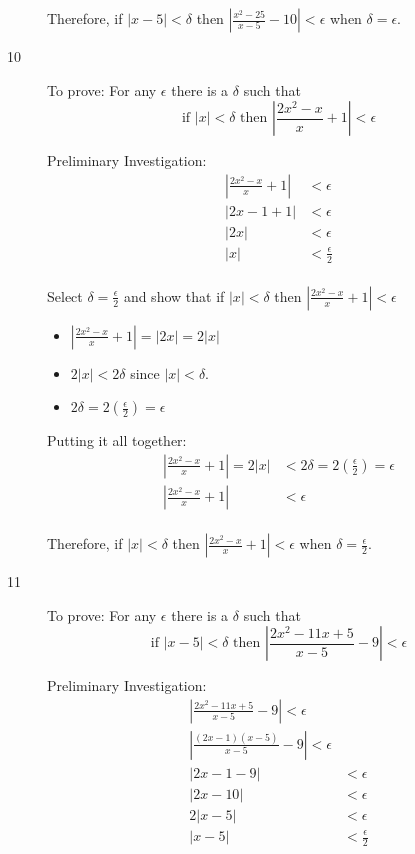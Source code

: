 \documentclass{exam}
\begin{document}
\begin{description}
Therefore, if $|x - 5| < \delta$ then $\left| \frac{x^2 - 25}{x-5} - 10 \right| < \epsilon$ when $\delta = \epsilon$.

\pagebreak

\item[10]
To prove: For any $\epsilon$ there is a $\delta$ such that 
\[
  \text{if } |x| < \delta \text{ then } \left|\frac{2x^2 - x}{x} + 1\right| < \epsilon
\]

Preliminary Investigation:
\begin{align*}
  \left|\frac{2x^2 - x}{x} + 1\right| &< \epsilon \\
  |2x - 1 + 1| &< \epsilon \\
  |2x| &< \epsilon \\
  |x| &< \frac{\epsilon}{2} \\
\end{align*}

Select $\delta = \frac{\epsilon}{2}$ and show that if $|x| < \delta$ then $\left|\frac{2x^2 - x}{x} + 1\right| < \epsilon$

\begin{itemize}
  \item $\left|\frac{2x^2 - x}{x} + 1\right| = |2x| = 2|x|$
  \item $2|x| < 2 \delta$ since $|x| < \delta$.
  \item $2 \delta = 2 \left( \frac{\epsilon}{2} \right) = \epsilon$
\end{itemize}

Putting it all together:
\begin{align*}
  \left|\frac{2x^2 - x}{x} + 1\right| = 2|x| &< 2 \delta = 2 \left( \frac{\epsilon}{2} \right) = \epsilon \\ 
  \left|\frac{2x^2 - x}{x} + 1\right| &< \epsilon \\ 
\end{align*}

Therefore, if $|x| < \delta$ then $\left|\frac{2x^2 - x}{x} + 1\right| < \epsilon$ when $\delta = \frac{\epsilon}{2}$.

\pagebreak

\item[11]
To prove: For any $\epsilon$ there is a $\delta$ such that 
\[
  \text{if } |x - 5| < \delta \text{ then } \left|\frac{2x^2 - 11x + 5}{x-5} -9 \right| < \epsilon
\]

Preliminary Investigation:
\begin{align*}
  \left|\frac{2x^2 - 11x + 5}{x-5} -9 \right| < \epsilon \\
  \left|\frac{(2x - 1)(x-5)}{x-5} -9 \right| < \epsilon \\
  |2x - 1 - 9| &< \epsilon \\
  |2x - 10| &< \epsilon \\
  2|x - 5| &< \epsilon \\
  |x - 5| &< \frac{\epsilon}{2} \\
\end{align*}


\end{description}
\end{document}
